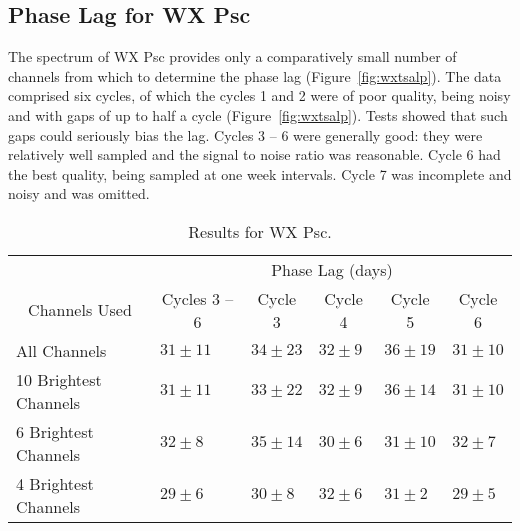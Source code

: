 \documentclass[usenatbib,usegraphicx]{mn2e}
\begin{document}
\subsection{Phase Lag for WX Psc}


The spectrum of WX Psc provides only a comparatively small number of
channels from which to determine the phase lag (Figure~\ref{fig:wxtsalp}).
The data comprised six cycles, of which the cycles 1 and 2 were of poor
quality, being noisy and with gaps of up to half a cycle
(Figure~\ref{fig:wxtsalp}).  Tests showed that such gaps could seriously
bias the lag.  Cycles 3 -- 6 were generally good: they were
relatively well sampled and the signal to noise ratio was reasonable.  Cycle
6 had the best quality, being sampled at one week intervals. Cycle 7 was
incomplete and noisy and was omitted.

\begin{table*}

\caption{Results for WX Psc.}
\label{tbl:reswxpsc}

\begin{tabular}{|l|l|l|l|l|l|}

\hline

\multicolumn{1}{c}{} &
\multicolumn{5}{c}{Phase Lag (days)} \\

\multicolumn{1}{c}{Channels Used} &
\multicolumn{1}{c}{Cycles 3 -- 6} &
\multicolumn{1}{c}{Cycle 3} &
\multicolumn{1}{c}{Cycle 4} &
\multicolumn{1}{c}{Cycle 5} &
\multicolumn{1}{c}{Cycle 6} \\


\hline

All Channels &  $31\pm11$ & $34\pm23$ &
 $32\pm9$ & $36\pm19$ & $31\pm10$ \\
10 Brightest Channels &  $31\pm11$ & $33\pm22$ &
 $32\pm9$ & $36\pm14$ & $31\pm10$ \\
6 Brightest Channels & $32\pm8$ &  $35\pm14$ &
 $30\pm6$ & $31\pm10$ & $32\pm7$ \\
4 Brightest Channels & $29\pm6$ & $30\pm8$ &
 $32\pm6$ & $31\pm2$ & $29\pm5$ \\

\hline

\end{tabular}
\end{table*}
\end{document}
